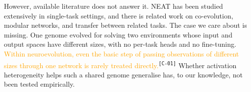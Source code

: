 \documentclass[12pt]{article}
\newcommand{\revID}[1]{\textsuperscript{\scriptsize\texttt{[#1]}}}
\newcommand{\revWeak}[2]{\textcolor{orange}{#2}\revID{#1}}    %
\begin{document}

% 

However, available literature does not answer it.
NEAT has been studied extensively in single-task settings, and there is related work on co-evolution, modular networks, and transfer between related tasks.
The case we care about is missing. One genome evolved for solving two environments whose input and output spaces have different sizes, with no per-task heads and no fine-tuning.
\revWeak{C-01}{Within neuroevolution, even the basic step of passing observations of different sizes through one network is rarely treated directly.} 
Whether activation heterogeneity helps such a shared genome generalise has, to our knowledge, not been tested empirically.
\end{document}
